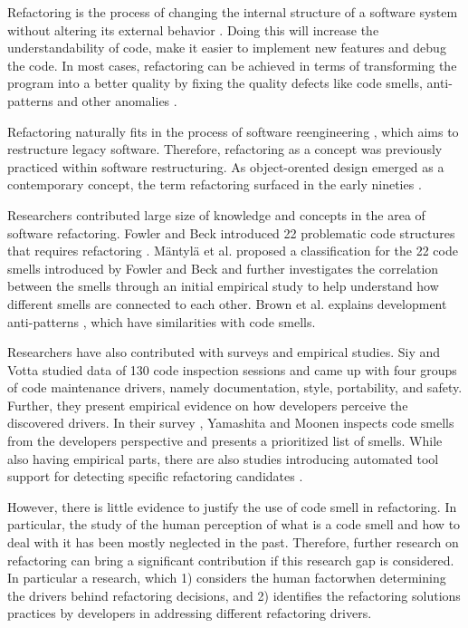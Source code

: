 Refactoring is the process of changing the internal structure of a software system without altering its external behavior \cite{fowlerRefactor}. Doing this will increase the understandability of code, make it easier to implement new features and debug the code. In most cases, refactoring can be achieved in terms of transforming the program into a better quality by fixing the quality defects like code smells, anti-patterns and other anomalies \cite{shatnawiEmpirical}.

Refactoring naturally fits in the process of software reengineering \cite{demeyerReengineering}, which aims to restructure legacy software. Therefore, refactoring as a concept was previously practiced within software restructuring. As object-orented design emerged as a contemporary concept, the term refactoring surfaced in the early nineties \cite{fowlerRefactor}. 

Researchers contributed large size of knowledge and concepts in the area of software refactoring. Fowler and Beck introduced 22 problematic code structures that requires refactoring \cite{fowlerRefactor}. Mäntylä et al. proposed a classification \cite{mantylaTaxonomy} for the 22 code smells introduced by Fowler and Beck and further investigates the correlation between the smells through an initial empirical study to help understand how different smells are connected to each other. Brown et al. explains development anti-patterns \cite{brownAntiPatterns}, which have similarities with code smells.

Researchers have also contributed with surveys and empirical studies. Siy and Votta \cite{siyInspection} studied data of 130 code inspection sessions and came up with four groups of code maintenance drivers, namely documentation, style, portability, and safety. Further, they present empirical evidence on how developers perceive the discovered drivers. In their survey \cite{yamashitaDevelopers}, Yamashita and Moonen inspects code smells from the developers perspective and presents a prioritized list of smells. While also having empirical parts, there are also studies introducing automated tool support for detecting specific refactoring candidates \cite{simonMetrics,kataokaAutomated,tourweRefactoring}. 

However, there is little evidence to justify the use of code smell in refactoring. In particular, the study of the human perception of what is a code smell and how to deal with it has been mostly neglected in the past. Therefore, further research on refactoring can bring a significant contribution if this research gap is considered. In particular a research, which 1) considers the human factorwhen determining the drivers behind refactoring decisions, and 2) identifies the refactoring solutions practices by developers in addressing different refactoring drivers. 

